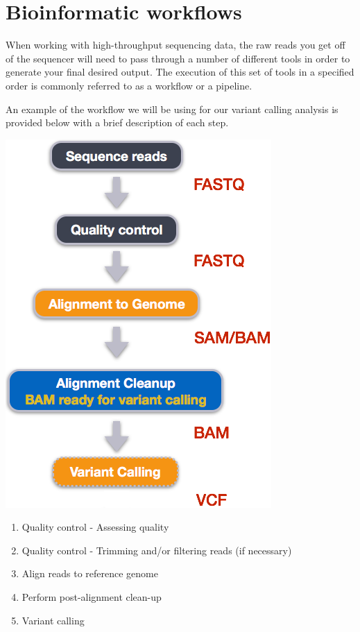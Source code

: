 \documentclass[
  letterpaper,
  DIV=11,
  numbers=noendperiod]{scrreprt}
\begin{document}
\hypertarget{bioinformatic-workflows}{%
\section{Bioinformatic workflows}\label{bioinformatic-workflows}}

When working with high-throughput sequencing data, the raw reads you get
off of the sequencer will need to pass through a number of different
tools in order to generate your final desired output. The execution of
this set of tools in a specified order is commonly referred to as a
workflow or a pipeline.

An example of the workflow we will be using for our variant calling
analysis is provided below with a brief description of each step.

\includegraphics{images/pipeline.png}

\begin{enumerate}
\def\labelenumi{\arabic{enumi}.}
\item
  Quality control - Assessing quality
\item
  Quality control - Trimming and/or filtering reads (if necessary)
\item
  Align reads to reference genome
\item
  Perform post-alignment clean-up
\item
  Variant calling
\end{enumerate}
\end{document}
